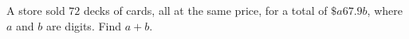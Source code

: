 A store sold $72$ decks of cards, all at the same price, for a total of $\$a67.9b$, where $a$ and $b$ are digits. Find $a+b$.

